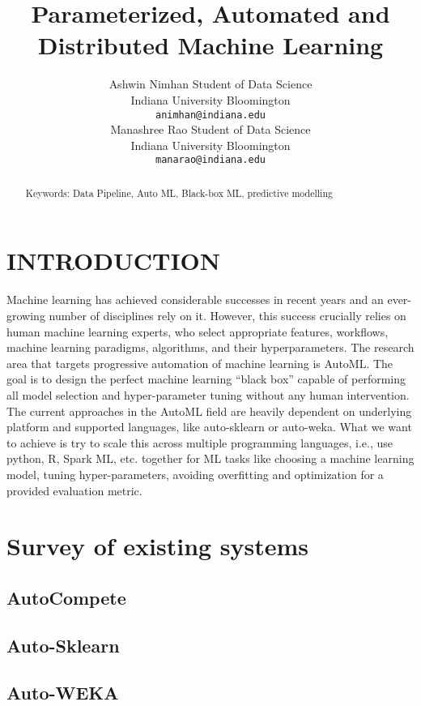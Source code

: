 \documentclass[10pt,onecolumn]{IEEEtran}
\title{\LARGE \bf
Parameterized, Automated and Distributed Machine Learning
}
\author{ 
		 \parbox{3 in}
		 {\centering Ashwin Nimhan
         Student of Data Science\\
         Indiana University Bloomington\\
         {\tt\small animhan@indiana.edu}}
         \hspace*{ 0.5 in}
         \parbox{3 in}{\centering Manashree Rao
         Student of Data Science\\
         Indiana University Bloomington\\
         {\tt\small manarao@indiana.edu}}
         \hspace*{ 0.5 in}
}
\begin{document}
\maketitle
\begin{abstract}

Keywords: Data Pipeline, Auto ML, Black-box ML, predictive modelling
\end{abstract}


\section{INTRODUCTION}
Machine learning has achieved considerable successes in recent years and an ever-growing number of disciplines rely on it. However, this success crucially relies on human machine learning experts, who select appropriate features, workflows, machine learning paradigms, algorithms, and their hyperparameters.  
The research area that targets progressive automation of machine learning is AutoML. The goal is to design the perfect machine learning “black box” capable of performing all model selection and hyper-parameter tuning without any human intervention. 
The current approaches in the AutoML field are heavily dependent on underlying platform and supported languages, like auto-sklearn or auto-weka. What we want to achieve is try to scale this across multiple programming languages, i.e., use python, R, Spark ML, etc. together for ML tasks like choosing a machine learning model, tuning hyper-parameters, avoiding overfitting and optimization for a provided evaluation metric.


\section{Survey of existing systems}

\subsection{AutoCompete}

\subsection{Auto-Sklearn}

\subsection{Auto-WEKA}
\end{document}
